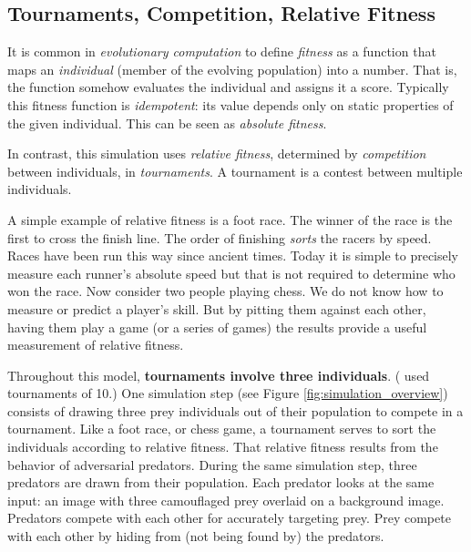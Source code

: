 \documentclass[letterpaper]{article}
\newcommand{\jargon}[1]{\textit{#1}}
\begin{document}
\subsection{Tournaments, Competition, Relative Fitness}
\label{subsec:tournaments}
It is common in \jargon{evolutionary computation} to define \jargon{fitness} as a function that maps an \jargon{individual} (member of the evolving population) into a number. That is, the function somehow evaluates the individual and assigns it a score. Typically this fitness function is \jargon{idempotent}: its value depends only on static properties of the given individual. This can be seen as \jargon{absolute fitness}.
\par
In contrast, this simulation uses \jargon{relative fitness}, determined by \jargon{competition} between individuals, in \jargon{tournaments}. A tournament is a contest between multiple individuals. 
\par
A simple example of relative fitness is a foot race. The winner of the race is the first to cross the finish line. The order of finishing \jargon{sorts} the racers by speed. Races have been run this way since ancient times. Today it is simple to precisely measure each runner's absolute speed but that is not required to determine who won the race. Now consider two people playing chess. We do not know how to measure or predict a player's skill. But by pitting them against each other, having them play a game (or a series of games) the results provide a useful measurement of relative fitness. 
\par
Throughout this model, \textbf{tournaments involve three individuals}. (\citet{reynolds_iec_2011} used tournaments of 10.) One simulation step (see Figure \ref{fig:simulation_overview}) consists of drawing three prey individuals out of their population to compete in a tournament. Like a foot race, or chess game, a tournament serves to sort the individuals according to relative fitness. That relative fitness results from the behavior of adversarial predators. During the same simulation step, three predators are drawn from their population. Each predator looks at the same input: an image with three camouflaged prey overlaid on a background image. Predators compete with each other for accurately targeting prey. Prey compete with each other by hiding from (not being found by) the predators.
\par

\end{document}
